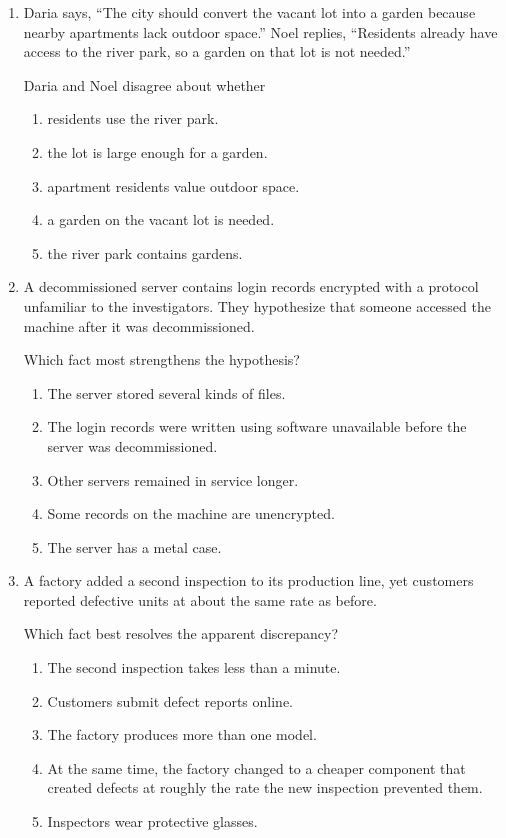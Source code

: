 \begin{enumerate}

\item Daria says, ``The city should convert the vacant lot into a garden because nearby apartments lack outdoor space.'' Noel replies, ``Residents already have access to the river park, so a garden on that lot is not needed.''

Daria and Noel disagree about whether
\begin{enumerate}
\item[(A)] residents use the river park.
\item[(B)] the lot is large enough for a garden.
\item[(C)] apartment residents value outdoor space.
\item[(D)] a garden on the vacant lot is needed.
\item[(E)] the river park contains gardens.
\end{enumerate}

\item A decommissioned server contains login records encrypted with a protocol unfamiliar to the investigators. They hypothesize that someone accessed the machine after it was decommissioned.

Which fact most strengthens the hypothesis?
\begin{enumerate}
\item[(A)] The server stored several kinds of files.
\item[(B)] The login records were written using software unavailable before the server was decommissioned.
\item[(C)] Other servers remained in service longer.
\item[(D)] Some records on the machine are unencrypted.
\item[(E)] The server has a metal case.
\end{enumerate}

\item A factory added a second inspection to its production line, yet customers reported defective units at about the same rate as before.

Which fact best resolves the apparent discrepancy?
\begin{enumerate}
\item[(A)] The second inspection takes less than a minute.
\item[(B)] Customers submit defect reports online.
\item[(C)] The factory produces more than one model.
\item[(D)] At the same time, the factory changed to a cheaper component that created defects at roughly the rate the new inspection prevented them.
\item[(E)] Inspectors wear protective glasses.
\end{enumerate}


\end{enumerate}
